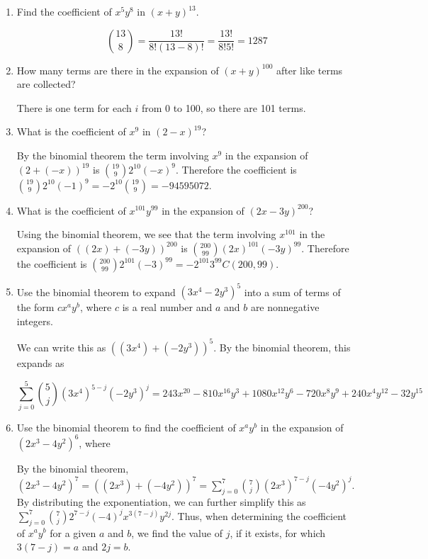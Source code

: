 \documentclass[11pt]{article}
\begin{document}
\begin{enumerate}[label=\textbf{\arabic*.}]
	\item Find the coefficient of $x^5y^8$ in $(x + y)^{13}$.
	
	$$\binom{13}{8} = \frac{13!}{8!(13 - 8)!} = \frac{13!}{8!5!} = 1287$$
	
	\item How many terms are there in the expansion of $(x + y)^{100}$ after like terms are collected?
	
	There is one term for each $i$ from 0 to 100, so there are 101 terms.
	
	\item What is the coefficient of $x^9$ in $(2 - x)^{19}$?
	
	By the binomial theorem the term involving $x^9$ in the expansion of $(2 + (-x))^{19}$ is $\binom{19}{9}2^{10}(-x)^9$. Therefore the coefficient is $\binom{19}{9}2^{10}(-1)^9 = -2^{10}\binom{19}{9} = -94595072$.
	
	\item What is the coefficient of $x^{101}y^{99}$ in the expansion of $(2x - 3y)^{200}$?
	
	Using the binomial theorem, we see that the term involving $x^{101}$ in the expansion of $((2x) + (-3y))^{200}$ is $\binom{200}{99}(2x)^{101}(-3y)^{99}$. Therefore the coefficient is $\binom{200}{99}2^{101}(-3)^{99} = -2^{101}3^{99}C(200, 99)$.
	
	\item Use the binomial theorem to expand $(3x^4 - 2y^3)^5$ into a sum of terms of the form $cx^ay^b$, where $c$ is a real number and $a$ and $b$ are nonnegative integers.
	
	We can write this as $((3x^4) + (-2y^3))^5$. By the binomial theorem, this expands as
	
	$$\sum_{j = 0}^{5} \binom{5}{j} (3x^4)^{5 - j}(-2y^3)^j = 243x^{20} - 810x^{16}y^3 + 1080x^{12}y^6 - 720x^8y^9 + 240x^4y^{12} - 32y^{15}$$
	
	\item Use the binomial theorem to find the coefficient of $x^ay^b$ in the expansion of $(2x^3 - 4y^2)^6$, where
	
	By the binomial theorem, $(2x^3 - 4y^2)^7 = ((2x^3) + (-4y^2))^7 = \sum_{j = 0}^{7} \binom{7}{j} (2x^3)^{7 - j}(-4y^2)^j$. By distributing the exponentiation, we can further simplify this as $\sum_{j = 0}^{7} \binom{7}{j} 2^{7 - j}(-4)^jx^{3(7 - j)}y^{2j}$. Thus, when determining the coefficient of $x^ay^b$ for a given $a$ and $b$, we find the value of $j$, if it exists, for which $3(7 - j) = a$ and $2j = b$.
	

\end{enumerate}
\end{document}
